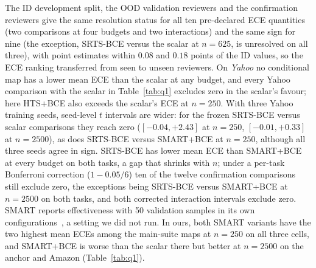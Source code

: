 \documentclass[sigconf,anonymous,review]{acmart}
\begin{document}
 The ID development split, the OOD validation reviewers and the
confirmation reviewers give the same resolution status for all ten pre-declared ECE quantities (two
comparisons at four budgets and two interactions) and the same sign for nine (the exception, SRTS-BCE versus the
scalar at $n{=}625$, is unresolved on all three), with point estimates
within $0.08$ and $0.18$ points of the ID values, so the ECE ranking transferred
from seen to unseen reviewers. On \emph{Yahoo} no conditional
map has a lower mean ECE than the scalar at any budget, and every Yahoo
comparison with the scalar in Table~\ref{tab:q1} excludes zero in the
scalar's favour; here HTS+BCE also exceeds the scalar's ECE at $n{=}250$. With three Yahoo
training seeds, seed-level $t$ intervals are wider: for the frozen SRTS-BCE versus scalar comparisons they reach zero
($[-0.04,+2.43]$ at $n{=}250$, $[-0.01,+0.33]$ at $n{=}2500$), as does
SRTS-BCE versus SMART+BCE at $n{=}250$, although all three seeds agree
in sign. SRTS-BCE has lower mean ECE than SMART+BCE at every
budget on both tasks, a gap that shrinks with $n$; under a per-task
Bonferroni correction ($1-0.05/6$) ten of the twelve confirmation
comparisons still exclude zero, the exceptions being SRTS-BCE versus
SMART+BCE at $n{=}2500$ on both tasks, and both corrected interaction intervals exclude zero.
SMART reports effectiveness with 50 validation samples in its own
configurations~\cite{guo2026smart}, a setting we did not run. In ours, both SMART variants have the two highest mean ECEs among the
main-suite maps at $n{=}250$ on all three cells, and SMART+BCE is worse
than the scalar there but better at $n{=}2500$ on the anchor and Amazon
(Table~\ref{tab:q1}). 
\end{document}
